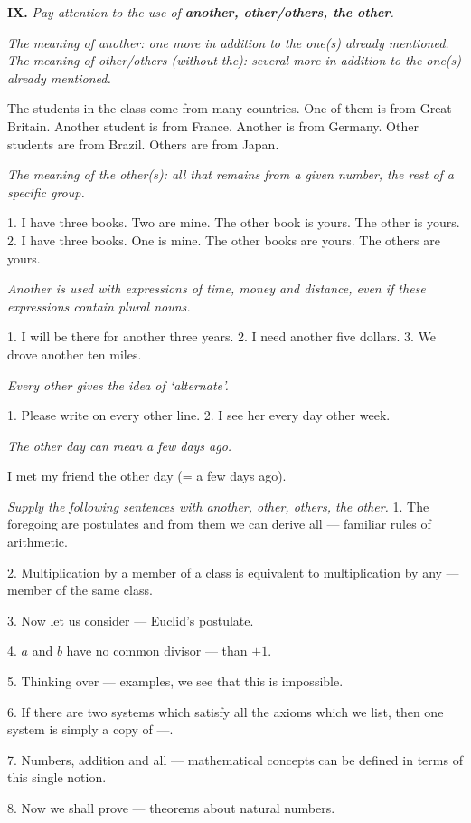 \documentclass[a4paper]{article}
\newcommand{\ETask}[2]{\medskip\par\textbf{#1.} \textit{#2}\par}
\begin{document}
\ETask{IX}{Pay attention to the use of \textbf{another, other/others, the other}.}
\textit{The meaning of another: one more in addition to the one(s) already mentioned. The meaning of other/others (without the):
several more in addition to the one(s) already mentioned.}

The students in the class come from many countries. One of them is from Great Britain. Another student is from France.
Another is from Germany. Other students are from Brazil. Others are from Japan.

\textit{The meaning of the other(s): all that remains from a given number, the rest of a specific group.}

1. I have three books. Two are mine. The other book is yours. The other is yours. 2. I have three books. One is mine.
The other books are yours. The others are yours.

\textit{Another is used with expressions of time, money and distance, even if these expressions contain plural nouns.}

1. I will be there for another three years. 2. I need another five dollars. 3. We drove another ten miles.

\textit{Every other gives the idea of `alternate'.}

1. Please write on every other line. 2. I see her every day other week.

\textit{The other day can mean a few days ago.}

I met my friend the other day (= a few days ago).

\medskip
\textit{Supply the following sentences with another, other, others, the other.}
1. The foregoing are postulates and from them we can derive all --- familiar rules of arithmetic.

2. Multiplication by a member of a class is equivalent to multiplication by any --- member of the same class.

3. Now let us consider --- Euclid's postulate.

4. $a$ and $b$ have no common divisor --- than $\pm 1$.

5. Thinking over --- examples, we see that this is impossible.

6. If there are two systems which satisfy all the axioms which we list, then one system is simply a copy of ---.

7. Numbers, addition and all --- mathematical concepts can be defined in terms of this single notion.

8. Now we shall prove --- theorems about natural numbers.
\end{document}
